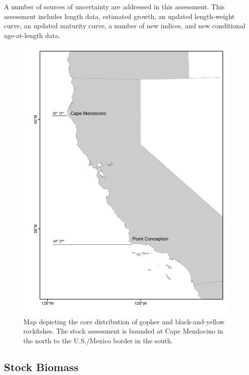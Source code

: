\documentclass[12pt,]{article}
\begin{document}
A number of sources of uncertainty are addressed in this assessment.
This assessment includes length data, estimated growth, an updated
length-weight curve, an updated maturity curve, a number of new indices,
and new conditional age-at-length data.

\begin{figure}
\centering
\includegraphics{Figures/assess_region_map.png}
\caption{Map depicting the core distribution of gopher and
black-and-yellow rockfishes. The stock assessment is bounded at Cape
Mendocino in the north to the U.S./Mexico border in the south.
\label{fig:assess_region_map}}
\end{figure}

\FloatBarrier

\subsection*{Stock Biomass}\label{stock-biomass}
\end{document}
